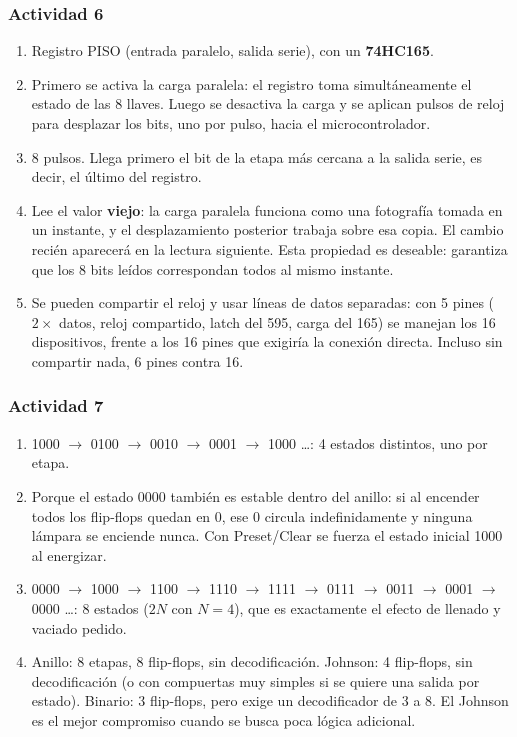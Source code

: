 \subsubsection*{Actividad 6}

\begin{enumerate}[label=\textbf{\alph*)}]
    \item Registro PISO (entrada paralelo, salida serie), con un \textbf{74HC165}.
    \item Primero se activa la carga paralela: el registro toma simultáneamente el estado de las 8 llaves. Luego se desactiva la carga y se aplican pulsos de reloj para desplazar los bits, uno por pulso, hacia el microcontrolador.
    \item 8 pulsos. Llega primero el bit de la etapa más cercana a la salida serie, es decir, el último del registro.
    \item Lee el valor \textbf{viejo}: la carga paralela funciona como una fotografía tomada en un instante, y el desplazamiento posterior trabaja sobre esa copia. El cambio recién aparecerá en la lectura siguiente. Esta propiedad es deseable: garantiza que los 8 bits leídos correspondan todos al mismo instante.
    \item Se pueden compartir el reloj y usar líneas de datos separadas: con 5 pines ($2 \times$ datos, reloj compartido, latch del 595, carga del 165) se manejan los 16 dispositivos, frente a los 16 pines que exigiría la conexión directa. Incluso sin compartir nada, 6 pines contra 16.
\end{enumerate}

\subsubsection*{Actividad 7}

\begin{enumerate}[label=\textbf{\alph*)}]
    \item 1000 $\rightarrow$ 0100 $\rightarrow$ 0010 $\rightarrow$ 0001 $\rightarrow$ 1000 \ldots: 4 estados distintos, uno por etapa.
    \item Porque el estado 0000 también es estable dentro del anillo: si al encender todos los flip-flops quedan en 0, ese 0 circula indefinidamente y ninguna lámpara se enciende nunca. Con Preset/Clear se fuerza el estado inicial 1000 al energizar.
    \item 0000 $\rightarrow$ 1000 $\rightarrow$ 1100 $\rightarrow$ 1110 $\rightarrow$ 1111 $\rightarrow$ 0111 $\rightarrow$ 0011 $\rightarrow$ 0001 $\rightarrow$ 0000 \ldots: 8 estados ($2N$ con $N = 4$), que es exactamente el efecto de llenado y vaciado pedido.
    \item Anillo: 8 etapas, 8 flip-flops, sin decodificación. Johnson: 4 flip-flops, sin decodificación (o con compuertas muy simples si se quiere una salida por estado). Binario: 3 flip-flops, pero exige un decodificador de 3 a 8. El Johnson es el mejor compromiso cuando se busca poca lógica adicional.
\end{enumerate}

